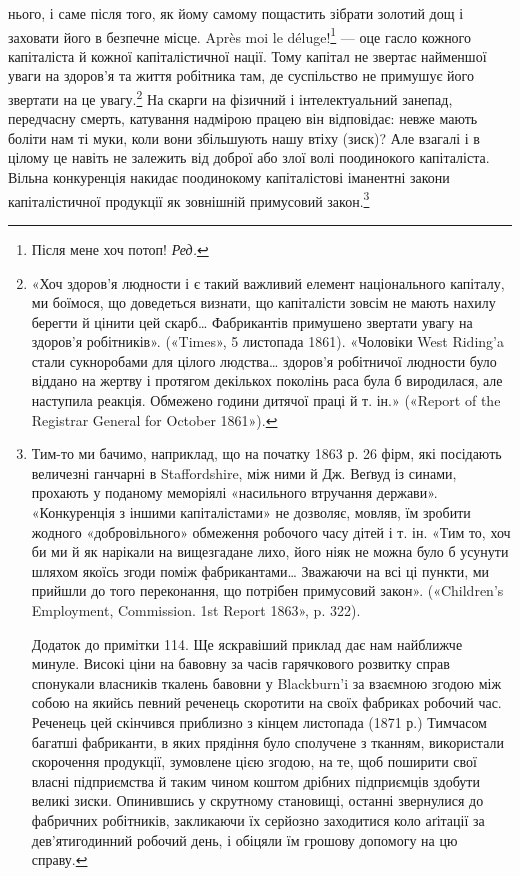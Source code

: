 нього, і саме після того, як йому самому пощастить зібрати золотий
дощ і заховати його в безпечне місце. Après moi le déluge!\footnote*{
Після мене хоч потоп! \emph{Ред.}
} —
оце гасло кожного капіталіста й кожної капіталістичної нації.
Тому капітал не звертає найменшої уваги на здоров’я та життя
робітника там, де суспільство не примушує його звертати на це
увагу.\footnote{
«Хоч здоров'я людности і є такий важливий елемент національного
капіталу, ми боїмося, що доведеться визнати, що капіталісти зовсім
не мають нахилу берегти й цінити цей скарб\dots{} Фабрикантів примушено
звертати увагу на здоров'я робітників». («Times», 5 листопада 1861).
«Чоловіки West Riding’a стали сукноробами для цілого людства\dots{} здоров’я
робітничої людности було віддано на жертву і протягом декількох
поколінь раса була б виродилася, але наступила реакція. Обмежено
години дитячої праці й т. ін.» («Report of the Registrar General for October
1861»).
} На скарги на фізичний і інтелектуальний занепад,
передчасну смерть, катування надмірою працею він відповідає:
невже мають боліти нам ті муки, коли вони збільшують нашу
втіху (зиск)? Але взагалі і в цілому це навіть не залежить від
доброї або злої волі поодинокого капіталіста. Вільна конкуренція
накидає поодинокому капіталістові іманентні закони капіталістичної
продукції як зовнішній примусовий закон.\footnote{
Тим-то ми бачимо, наприклад, що на початку 1863 р. 26 фірм,
які посідають величезні ганчарні в Staffordshire, між ними й Дж. Веґвуд
із синами, прохають у поданому меморіялі «насильного втручання держави».
«Конкуренція з іншими капіталістами» не дозволяє, мовляв, їм
зробити жодного «добровільного» обмеження робочого часу дітей і т. ін.
«Тим то, хоч би ми й як нарікали на вищезгадане лихо, його ніяк не можна
було б усунути шляхом якоїсь згоди поміж фабрикантами\dots{} Зважаючи на
всі ці пункти, ми прийшли до того переконання, що потрібен примусовий
закон». («Children’s Employment, Commission. 1st Report 1863»,
p. 322).

Додаток до примітки 114. Ще яскравіший приклад дає нам найближче
минуле. Високі ціни на бавовну за часів гарячкового розвитку справ спонукали
власників ткалень бавовни у Blackburn’i за взаємною згодою між
собою на якийсь певний реченець скоротити на своїх фабриках робочий
час. Реченець цей скінчився приблизно з кінцем листопада (1871 р.)
Тимчасом багатші фабриканти, в яких прядіння було сполучене з тканням,
використали скорочення продукції, зумовлене цією згодою, на те, щоб
поширити свої власні підприємства й таким чином коштом дрібних підприємців
здобути великі зиски. Опинившись у скрутному становищі,
останні звернулися до фабричних робітників, закликаючи їх серйозно
заходитися коло аґітації за дев’ятигодинний робочий день, і обіцяли їм
грошову допомогу на цю справу.
}

